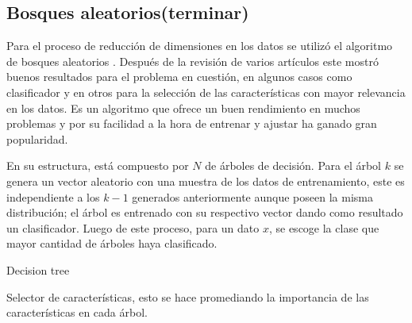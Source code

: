 \subsection{Bosques aleatorios(terminar)}
Para el proceso de reducción de dimensiones en los datos se utilizó el algoritmo de bosques aleatorios \cite{breiman2001random}. Después de la revisión de varios artículos \cite{almseidin2017evaluation,anani2018recurrent, abualkibash2019machine, hasan2016feature} este mostró buenos resultados para el problema en cuestión, en algunos casos como clasificador y en otros para la selección de las características con mayor relevancia en los datos. Es un algoritmo que ofrece un buen rendimiento en muchos problemas y por su facilidad a la hora de entrenar y ajustar ha ganado gran popularidad.

En su estructura, está compuesto por $N$ de árboles de decisión. Para el árbol $k$ se genera un vector aleatorio con una muestra de los datos de entrenamiento, este es independiente a los $k - 1$ generados anteriormente aunque poseen la misma distribución; el árbol es entrenado con su respectivo vector dando como resultado un clasificador. Luego de este proceso, para un dato $x$, se escoge la clase que mayor cantidad de árboles haya clasificado.

Decision tree

Selector de características, esto se hace promediando la importancia de las características en cada árbol.



